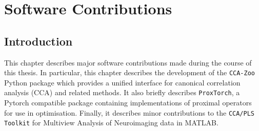 \chapter{Software Contributions}\label{ch:software-contributions}

\section{Introduction}

This chapter describes major software contributions made during the course of this thesis. In particular, this chapter describes the development of the \texttt{CCA-Zoo} Python package which provides a unified interface for canonical correlation analysis (CCA) and related methods. It also briefly describes \texttt{ProxTorch}, a Pytorch compatible package containing implementations of proximal operators for use in optimisation. Finally, it describes minor contributions to the \texttt{CCA/PLS Toolkit} for Multiview Analysis of Neuroimaging data in MATLAB.






